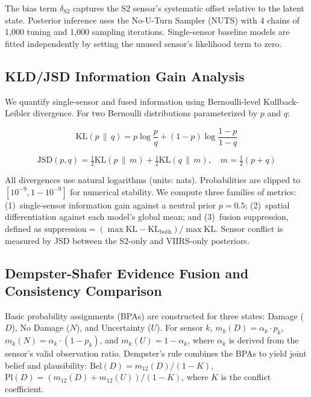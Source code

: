 \documentclass[wcp]{jmlr}
\begin{document}
The bias term $\delta_{\text{S2}}$ captures the S2 sensor's systematic
offset relative to the latent state. Posterior inference uses the
No-U-Turn Sampler (NUTS) with 4 chains of 1{,}000 tuning and 1{,}000
sampling iterations. Single-sensor baseline models are fitted independently
by setting the unused sensor's likelihood term to zero.

\subsection{KLD/JSD Information Gain Analysis}\label{sec:kld}

We quantify single-sensor and fused information using Bernoulli-level
Kullback-Leibler divergence. For two Bernoulli distributions parameterized
by $p$ and $q$:

\begin{equation}
\mathrm{KL}(p \,\|\, q) = p\log\frac{p}{q} + (1-p)\log\frac{1-p}{1-q}
\label{eq:kl}
\end{equation}

\begin{equation}
\mathrm{JSD}(p, q) = \tfrac{1}{2}\mathrm{KL}(p \,\|\, m)
  + \tfrac{1}{2}\mathrm{KL}(q \,\|\, m),\quad
  m = \tfrac{1}{2}(p+q)
\label{eq:jsd}
\end{equation}

All divergences use natural logarithms (units: nats). Probabilities are
clipped to $[10^{-9}, 1-10^{-9}]$ for numerical stability. We compute three
families of metrics: (1)~single-sensor information gain against a neutral
prior $p=0.5$; (2)~spatial differentiation against each model's global
mean; and (3)~fusion suppression, defined as
$\text{suppression} = (\max\text{KL} - \text{KL}_{\text{both}}) /
\max\text{KL}$. Sensor conflict is measured by JSD between the S2-only and
VIIRS-only posteriors.

\subsection{Dempster-Shafer Evidence Fusion and Consistency
Comparison}\label{sec:ds}

Basic probability assignments (BPAs) are constructed for three states:
Damage ($D$), No Damage ($N$), and Uncertainty ($U$). For sensor $k$,
$m_k(D) = \alpha_k \cdot p_k$, $m_k(N) = \alpha_k \cdot (1-p_k)$, and
$m_k(U)=1-\alpha_k$, where $\alpha_k$ is derived from the sensor's valid
observation ratio. Dempster's rule combines the BPAs to yield joint belief
and plausibility:
$\text{Bel}(D) = m_{12}(D)/(1-K)$,
$\text{Pl}(D) = (m_{12}(D)+m_{12}(U))/(1-K)$,
where $K$ is the conflict coefficient.
\end{document}
